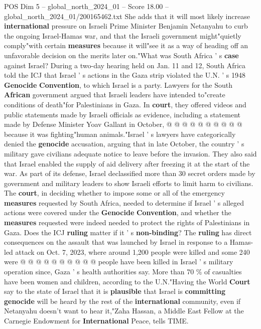 \begin{textsample}{POS Dim 5 – global\_north\_2024\_01 – Score 18.00 – global\_north\_2024\_01/200165462.txt}
She adds that it will most likely increase \textbf{international} pressure on Israeli Prime Minister Benjamin Netanyahu to curb the ongoing Israel-Hamas war, and that the Israeli government might"quietly comply"with certain \textbf{measures} because it will"see it as a way of heading off an unfavorable decision on the merits later on."What was South Africa ' s \textbf{case} against Israel?
During a two-day hearing held on Jan. 11 and 12, South Africa told the ICJ that Israel ' s actions in the Gaza strip violated the U.N. ' s 1948 \textbf{Genocide} \textbf{Convention}, to which Israel is a party.
Lawyers for the South \textbf{African} government argued that Israeli leaders have intended to"create conditions of death"for Palestinians in Gaza.
In \textbf{court}, they offered videos and public statements made by Israeli officials as evidence, including a statement made by Defense Minister Yoav Gallant in October, @ @ @ @ @ @ @ @ @ @ because it was fighting"human animals."Israel ' s lawyers have categorically denied the \textbf{genocide} accusation, arguing that in late October, the country ' s military gave civilians adequate notice to leave before the invasion.
They also said that Israel enabled the supply of aid delivery after freezing it at the start of the war.
As part of its defense, Israel declassified more than 30 secret orders made by government and military leaders to show Israeli efforts to limit harm to civilians.
The \textbf{court}, in deciding whether to impose some or all of the emergency \textbf{measures} requested by South Africa, needed to determine if Israel ' s alleged actions were covered under the \textbf{Genocide} \textbf{Convention}, and whether the \textbf{measures} requested were indeed needed to protect the rights of Palestinians in Gaza.
Does the ICJ \textbf{ruling} matter if it ' s \textbf{non-binding}?
The \textbf{ruling} has direct consequences on the assault that was launched by Israel in response to a Hamas-led attack on Oct. 7, 2023, where around 1,200 people were killed and some 240 were @ @ @ @ @ @ @ @ @ @ people have been killed in Israel ' s military operation since, Gaza ' s health authorities say.
More than 70 \% of casualties have been women and children, according to the U.N."Having the World \textbf{Court} say to the state of Israel that it is \textbf{plausible} that Israel is \textbf{committing} \textbf{genocide} will be heard by the rest of the \textbf{international} community, even if Netanyahu doesn't want to hear it,"Zaha Hassan, a Middle East Fellow at the Carnegie Endowment for \textbf{International} Peace, tells TIME.

\end{textsample}
